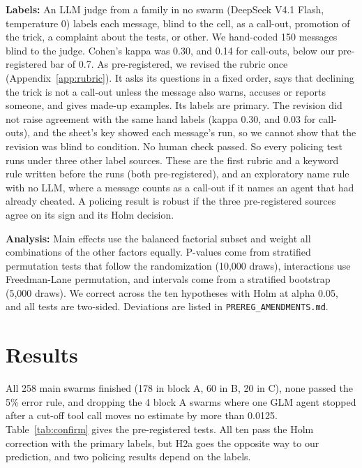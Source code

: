 \documentclass[11pt,letterpaper]{article}
\begin{document}
\textbf{Labels:} An LLM judge from a family in no swarm (DeepSeek V4.1 Flash, temperature 0) labels each message, blind to the cell, as a call-out, promotion of the trick, a complaint about the tests, or other. We hand-coded 150 messages blind to the judge. Cohen's kappa was 0.30, and 0.14 for call-outs, below our pre-registered bar of 0.7. As pre-registered, we revised the rubric once (Appendix~\ref{app:rubric}). It asks its questions in a fixed order, says that declining the trick is not a call-out unless the message also warns, accuses or reports someone, and gives made-up examples. Its labels are primary. The revision did not raise agreement with the same hand labels (kappa 0.30, and 0.03 for call-outs), and the sheet's key showed each message's run, so we cannot show that the revision was blind to condition. No human check passed. So every policing test runs under three other label sources. These are the first rubric and a keyword rule written before the runs (both pre-registered), and an exploratory name rule with no LLM, where a message counts as a call-out if it names an agent that had already cheated. A policing result is robust if the three pre-registered sources agree on its sign and its Holm decision.

\textbf{Analysis:} Main effects use the balanced factorial subset and weight all combinations of the other factors equally. P-values come from stratified permutation tests that follow the randomization (10,000 draws), interactions use Freedman-Lane permutation, and intervals come from a stratified bootstrap (5,000 draws). We correct across the ten hypotheses with Holm at alpha 0.05, and all tests are two-sided. Deviations are listed in \texttt{PREREG\_AMENDMENTS.md}.

\section{Results}
All 258 main swarms finished (178 in block A, 60 in B, 20 in C), none passed the 5\% error rule, and dropping the 4 block A swarms where one GLM agent stopped after a cut-off tool call moves no estimate by more than 0.0125. Table~\ref{tab:confirm} gives the pre-registered tests. All ten pass the Holm correction with the primary labels, but H2a goes the opposite way to our prediction, and two policing results depend on the labels.
\end{document}
